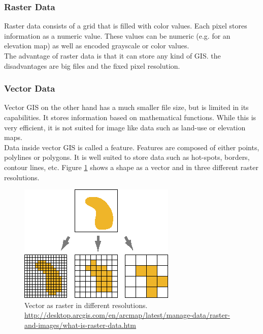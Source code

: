 \subsubsection{Raster Data}
 Raster data consists of a grid that is filled with color values. Each pixel stores information as a numeric value. These values can be numeric (e.g. for an elevation map) as well as encoded grayscale or color values.\\
 The advantage of raster data is that it can store any kind of GIS. the disadvantages are big files and the fixed pixel resolution.

\subsubsection{Vector Data}
Vector GIS on the other hand has a much smaller file size, but is limited in its capabilities. It stores information based on mathematical functions. While this is very efficient, it is not suited for image like data such as land-use or elevation maps.\\
Data inside vector GIS is called a feature. Features are composed of either points, polylines or polygons. It is well suited to store data such as hot-spots, borders, contour lines, etc. Figure \ref{fig:vector-raster} shows a shape as a vector and in three different raster resolutions.
\begin{figure}[H]
	\centering\includegraphics[width=.5\textwidth]{res/Vector-Raster}
	\caption{Vector as raster in different resolutions. \url{http://desktop.arcgis.com/en/arcmap/latest/manage-data/raster-and-images/what-is-raster-data.htm}}
	\label{fig:vector-raster}
\end{figure}



%
%
%
